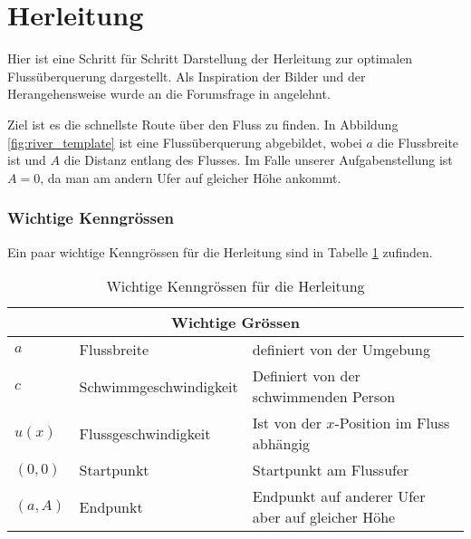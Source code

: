 %
%
%
%
\section{Herleitung
\label{schwimmen:section:naiver_weg}}

Hier ist eine Schritt für Schritt Darstellung der Herleitung zur
optimalen Flussüberquerung dargestellt. Als Inspiration der Bilder
und der Herangehensweise wurde an die Forumsfrage in
\cite{schwimmen:mathForum} angelehnt.

%

Ziel ist es die schnellste Route über den Fluss zu finden. In
Abbildung \ref{fig:river_template} ist eine Flussüberquerung
abgebildet, wobei \(a\) die Flussbreite ist und \(A\) die Distanz
entlang des Flusses. Im Falle unserer Aufgabenstellung ist \(A=0\),
da man am andern Ufer auf gleicher Höhe ankommt.

\subsubsection{Wichtige Kenngrössen}
Ein paar wichtige Kenngrössen für die Herleitung sind in Tabelle
\ref{table:Wichtige_Kenngroessen} zufinden.

\begin{table}
    \centering
    \renewcommand{\arraystretch}{1.3}
    \begin{tabularx}{\textwidth}{@{}ll>{\raggedright\arraybackslash}p{7cm}@{}}
        \multicolumn{3}{c}{Wichtige Grössen} \\
        \hline
        \(a\)   &   Flussbreite  &   definiert von der Umgebung \\
        \(c\)   &   Schwimmgeschwindigkeit        &   Definiert von der schwimmenden Person       \\
        \(u(x)\)   &   Flussgeschwindigkeit         &   Ist von der \(x\)-Position im Fluss abhängig     \\
        \((0,0)\)   &   Startpunkt         &   Startpunkt am Flussufer     \\
        \((a,A)\)   &   Endpunkt         &   Endpunkt auf anderer Ufer aber auf gleicher Höhe     \\
	\hline
    \end{tabularx}
    \caption{Wichtige Kenngrössen für die Herleitung}
    \label{table:Wichtige_Kenngroessen}
\end{table}


